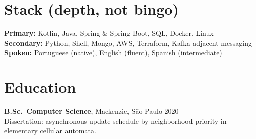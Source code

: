 \documentclass[10pt,a4paper]{article}
\begin{document}
\section{Stack (depth, not bingo)}
\noindent\textbf{Primary:} Kotlin, Java, Spring \& Spring Boot, SQL, Docker, Linux\\
\textbf{Secondary:} Python, Shell, Mongo, AWS, Terraform, Kafka-adjacent messaging\\
\textbf{Spoken:} Portuguese (native), English (fluent), Spanish (intermediate)

\section{Education}
\noindent\textbf{B.Sc.\ Computer Science}, Mackenzie, São Paulo \hfill 2020\\
{\small\color{muted}Dissertation: asynchronous update schedule by neighborhood priority in elementary cellular automata.}
\end{document}
